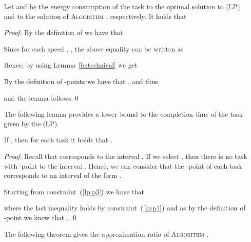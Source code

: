 \documentclass{llncs}
\newcommand{\algomr}{\textsc{Algorithm} \xspace}
\begin{document}
\begin{lemma}\label{le:speed}
Let  and  be the energy consumption of the task 
to the optimal solution to (LP) and to the solution of \algomr, respectively.
It holds that

\end{lemma}
\begin{proof}
By the definition of  we have that

Since for each speed , , the above equality can be written as

Hence, by using Lemma~\ref{le:technical} we get

By the definition of -points we have that
, and thus

and the lemma follows.\qed
\end{proof}

The following lemma provides a lower bound to the completion time  of the task  given by the (LP).
\begin{lemma}
If , then
for each task  it holds that .
\label{le:Clowerbound}
\end{lemma}
\begin{proof}
Recall that  corresponds to the interval .
If we select , then there is no task with -point to the interval .
Hence, we can consider that the -point of each task 
corresponds to an interval of the form .

Starting from constraint~(\ref{lp:p3}) we have that

where the last inequality holds by constraint~(\ref{lp:p1}) and as by the definition of -point we know that
.
\qed
\end{proof}

The following theorem gives the approximation ratio of \algomr.
\end{document}
